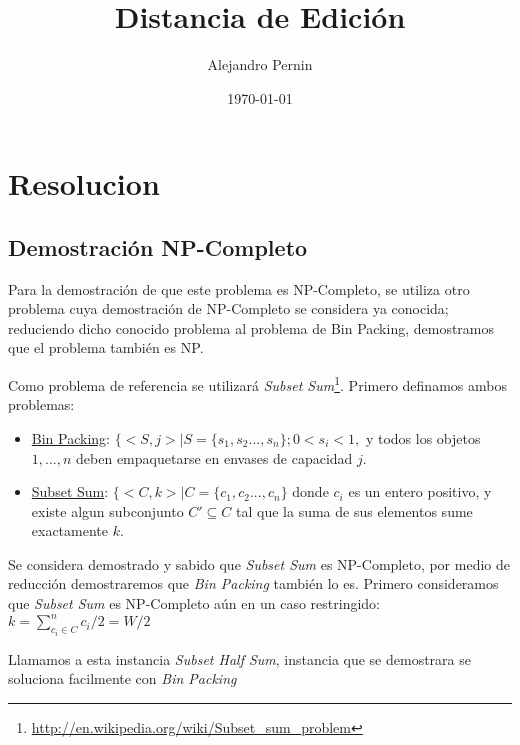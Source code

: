 \documentclass[12pt]{article}
\title{Distancia de Edición}
\author{
        Alejandro Pernin 
}
\date{\today}
\begin{document}


\maketitle

\newpage
\tableofcontents

\newpage



\newpage
\section{Resolucion}
	\subsection{Demostración NP-Completo}
		Para la demostración de que este problema es NP-Completo, se 
		utiliza otro problema cuya demostración de NP-Completo se considera
		ya conocida; reduciendo dicho conocido problema al problema de
		Bin Packing, demostramos que el problema también es NP.
		
		Como problema de referencia se utilizar\'a \emph{Subset Sum}\footnote{\url{http://en.wikipedia.org/wiki/Subset_sum_problem}}.
		Primero definamos ambos problemas:
		\begin{itemize}
			\item \underline{Bin Packing}: $\{ <S,j> | S = \{ s_{1},s_{2}...,s_{n}\}; 0<s_{i}<1,$ 
			y todos los objetos $1,...,n$ deben empaquetarse en envases de capacidad $j$.
			
			\item \underline{Subset Sum}: $\{ <C,k> | C = \{ c_{1},c_{2}...,c_{n}\}$ donde $c_{i}$
			es un entero positivo, y existe algun subconjunto $C'\subseteq C$ tal que la suma de sus
			elementos sume exactamente $k$.
		\end{itemize}
		
		Se considera demostrado y sabido que \emph{Subset Sum} es NP-Completo, 
		por medio de reducción demostraremos que \emph{Bin Packing} también lo es.
		Primero consideramos que \emph{Subset Sum} es NP-Completo aún en un caso restringido:
			\\ 
			
			$k=\sum_{c_{i}\in C}^{n} c_{i}/2 = W/2$
			
		Llamamos a esta instancia \emph{Subset Half Sum}, instancia que
		se demostrara se soluciona facilmente con \emph{Bin Packing}
\end{document}
